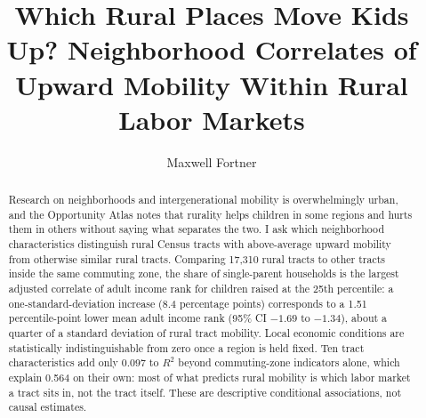 \documentclass[9pt,twoside]{pnas-new}
\begin{document}
\title{Which Rural Places Move Kids Up? Neighborhood Correlates of Upward
Mobility Within Rural Labor Markets}

\author[a]{Maxwell Fortner}





\begin{abstract}
Research on neighborhoods and intergenerational mobility is
overwhelmingly urban, and the Opportunity Atlas notes that rurality helps
children in some regions and hurts them in others without saying what separates
the two. I ask which neighborhood characteristics distinguish rural Census
tracts with above-average upward mobility from otherwise similar rural tracts.
Comparing
17{,}310 rural tracts to other tracts inside the same commuting zone, the
share of single-parent households is the largest adjusted correlate of adult
income rank for children raised at the 25th percentile: a one-standard-deviation
increase (8.4 percentage points) corresponds to a 1.51 percentile-point lower
mean adult income rank (95\% CI $-1.69$ to $-1.34$), about a quarter of a
standard deviation of rural tract mobility. Local economic conditions are
statistically indistinguishable from zero once a region is held fixed. Ten tract
characteristics add only 0.097 to $R^2$ beyond commuting-zone indicators
alone, which explain 0.564 on their own: most of what predicts rural mobility
is which labor market a tract sits in, not the tract itself. These are
descriptive conditional associations, not causal estimates.
\end{abstract}
\end{document}
